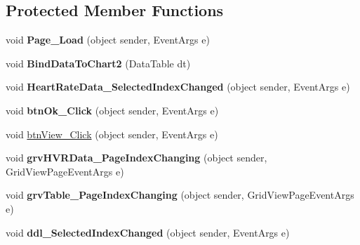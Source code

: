 \subsection*{Protected Member Functions}
\begin{DoxyCompactItemize}
\item 
\hypertarget{classusertrackmyhealth__heartrate_ad86ed0137e9dd18f53e1a18ce6cad19f}{void {\bfseries Page\-\_\-\-Load} (object sender, Event\-Args e)}\label{classusertrackmyhealth__heartrate_ad86ed0137e9dd18f53e1a18ce6cad19f}

\item 
\hypertarget{classusertrackmyhealth__heartrate_a328bcf5fc9202e7d278b87f6b0a3e3d5}{void {\bfseries Bind\-Data\-To\-Chart2} (Data\-Table dt)}\label{classusertrackmyhealth__heartrate_a328bcf5fc9202e7d278b87f6b0a3e3d5}

\item 
\hypertarget{classusertrackmyhealth__heartrate_a74a6f852f3eea904d13794cc15dc17bc}{void {\bfseries Heart\-Rate\-Data\-\_\-\-Selected\-Index\-Changed} (object sender, Event\-Args e)}\label{classusertrackmyhealth__heartrate_a74a6f852f3eea904d13794cc15dc17bc}

\item 
\hypertarget{classusertrackmyhealth__heartrate_aa7e242f3b808b01ade895c78be8832ae}{void {\bfseries btn\-Ok\-\_\-\-Click} (object sender, Event\-Args e)}\label{classusertrackmyhealth__heartrate_aa7e242f3b808b01ade895c78be8832ae}

\item 
void \hyperlink{classusertrackmyhealth__heartrate_a5f6b11f77073d9eea8fc1de08c238c99}{btn\-View\-\_\-\-Click} (object sender, Event\-Args e)
\item 
\hypertarget{classusertrackmyhealth__heartrate_a3db884907aa4740ada97798a928cefd9}{void {\bfseries grv\-H\-V\-R\-Data\-\_\-\-Page\-Index\-Changing} (object sender, Grid\-View\-Page\-Event\-Args e)}\label{classusertrackmyhealth__heartrate_a3db884907aa4740ada97798a928cefd9}

\item 
\hypertarget{classusertrackmyhealth__heartrate_a83373c53698ee1b6a8d65416816f194b}{void {\bfseries grv\-Table\-\_\-\-Page\-Index\-Changing} (object sender, Grid\-View\-Page\-Event\-Args e)}\label{classusertrackmyhealth__heartrate_a83373c53698ee1b6a8d65416816f194b}

\item 
\hypertarget{classusertrackmyhealth__heartrate_afff715db3f9e60b18d46a7e4f25c193c}{void {\bfseries ddl\-\_\-\-Selected\-Index\-Changed} (object sender, Event\-Args e)}\label{classusertrackmyhealth__heartrate_afff715db3f9e60b18d46a7e4f25c193c}


\end{DoxyCompactItemize}
